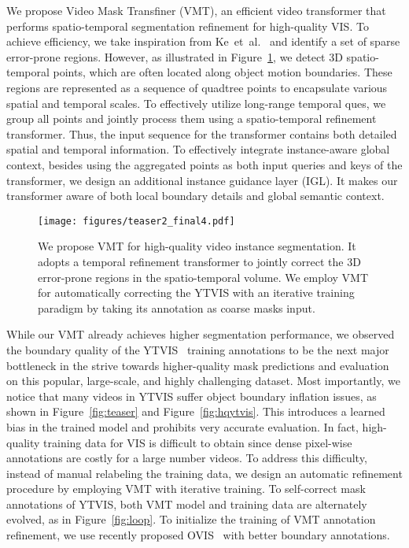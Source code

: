 \documentclass[runningheads]{llncs}
\begin{document}
We propose Video Mask Transfiner (VMT), an efficient video transformer that performs spatio-temporal segmentation refinement for high-quality VIS. To achieve efficiency, we take inspiration from Ke~et~al.~\cite{transfiner} and identify a set of sparse error-prone regions. However, as illustrated in Figure~\ref{fig:fig2}, we detect 3D spatio-temporal points, which are often located along object motion boundaries. These regions are represented as a sequence of quadtree points to encapsulate various spatial and temporal scales.
To effectively utilize long-range temporal ques, we group all points and jointly process them using a spatio-temporal refinement transformer. 
Thus, the input sequence for the transformer contains both detailed spatial and temporal information. 
To effectively integrate instance-aware global context, besides using the aggregated points as both input queries and keys of the transformer, we design an additional instance guidance layer (IGL). It makes our transformer aware of both local boundary details and global semantic context.


\begin{figure}[!t]
	\centering
\texttt{[image: figures/teaser2\_final4.pdf]}
\caption{We propose VMT for high-quality video instance segmentation. It adopts a temporal refinement transformer to jointly correct the 3D error-prone regions in the spatio-temporal volume. We employ VMT for automatically correcting the YTVIS with an iterative training paradigm by taking its annotation as coarse masks input. }
\label{fig:fig2}
\end{figure}

While our VMT already achieves higher segmentation performance, we observed the boundary quality of the YTVIS~\cite{yang2019video} training annotations to be the next major bottleneck in the strive towards higher-quality mask predictions and evaluation on this popular, large-scale, and highly challenging dataset.
Most importantly, we notice that many videos in YTVIS suffer object boundary inflation issues, as shown in Figure~\ref{fig:teaser} and Figure~\ref{fig:hqytvis}. This introduces a learned bias in the trained model and prohibits very accurate evaluation.
In fact, high-quality training data for VIS is difficult to obtain since dense pixel-wise annotations are costly for a large number videos.
To address this difficulty, instead of manual relabeling the training data, we design an automatic refinement procedure by employing VMT with iterative training. To self-correct mask annotations of YTVIS, both VMT model and training data are alternately evolved, as in Figure~\ref{fig:loop}. To initialize the training of VMT annotation refinement, we use recently proposed OVIS~\cite{qi2021occluded} with better boundary annotations.
\end{document}
